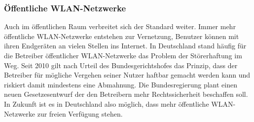 \begin{multicols}{3}
\subsubsection*{Öffentliche WLAN-Netzwerke}
Auch im öffentlichen Raum verbreitet sich der Standard weiter. Immer mehr öffentliche WLAN-Netzwerke entstehen zur Vernetzung, Benutzer können mit ihren Endgeräten an vielen Stellen ins Internet. In Deutschland stand häufig für die Betreiber öffentlicher WLAN-Netzwerke das Problem der Störerhaftung im Weg. Seit 2010 gilt nach Urteil des Bundesgerichtshofes das Prinzip, dass der Betreiber für mögliche Vergehen seiner Nutzer haftbar gemacht werden kann und riskiert damit mindestens eine Abmahnung. Die Bundesregierung plant einen neuen Gesetzesentwurf der den Betreibern mehr Rechtssicherheit beschaffen soll. In Zukunft ist es in Deutschland also möglich, dass mehr öffentliche WLAN-Netzwerke zur freien Verfügung stehen.
~\cite{basics.10}

\printbibliography[segment=14,heading=subbibliography]

\end{multicols}
\newpage
